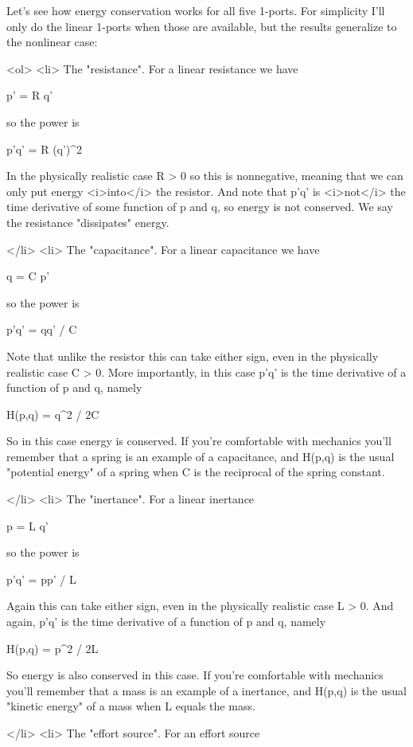 Let's see how energy conservation works for all five 1-ports.  For
simplicity I'll only do the linear 1-ports when those are available,
but the results generalize to the nonlinear case:

<ol>
<li>
   The "resistance".   For a linear resistance we have

  p' = R q'

  so the power is

  p'q' = R (q')^{2}

  In the physically realistic case R > 0 so this is nonnegative,
  meaning that we can only put energy <i>into</i> the resistor.
  And note that p'q' is <i>not</i> the time derivative of some 
  function of p and q, so energy is not conserved.  We say the
  resistance "dissipates" energy.

</li>
<li>
   The "capacitance".  For a linear capacitance we have

  q = C p'

  so the power is 

  p'q' = qq' / C

  Note that unlike the resistor this can take either sign, even
  in the physically realistic case C > 0.  More importantly, in
  this case p'q' is the time derivative of a function of p and q,
  namely 

  H(p,q) = q^{2} / 2C

  So in this case energy is conserved.  If you're comfortable
  with mechanics you'll remember that a spring is an example of
  a capacitance, and H(p,q) is the usual "potential energy" of a 
  spring when C is the reciprocal of the spring constant.
  
</li>
<li>
   The "inertance".  For a linear inertance

  p = L q'

  so the power is

  p'q' = pp' / L

  Again this can take either sign, even in the physically realistic
  case L > 0.  And again, p'q' is the time derivative of a function
  of p and q, namely

  H(p,q) = p^{2} / 2L

  So energy is also conserved in this case.  If you're comfortable
  with mechanics you'll remember that a mass is an example of
  a inertance, and H(p,q) is the usual "kinetic energy" of a mass
  when L equals the mass.

</li>
<li>
   The "effort source".  For an effort source

